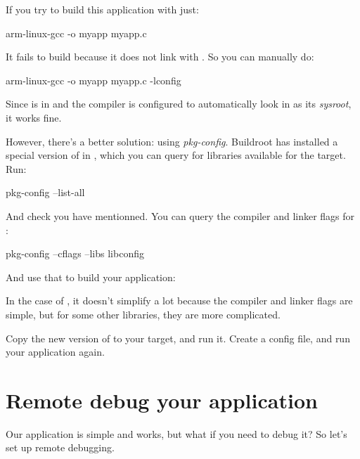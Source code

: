 If you try to build this application with just:

\begin{bashinput}
arm-linux-gcc -o myapp myapp.c
\end{bashinput}

It fails to build because it does not link with . So
you can manually do:

\begin{bashinput}
arm-linux-gcc -o myapp myapp.c -lconfig
\end{bashinput}

Since  is in  and the
compiler is configured to automatically look in 
as its {\em sysroot}, it works fine.

However, there's a better solution: using {\em pkg-config}. Buildroot
has installed a special version of  in
, which you can query for libraries
available for the target. Run:

\begin{bashinput}
pkg-config --list-all
\end{bashinput}

And check you have  mentionned. You can query the
compiler and linker flags for :

\begin{bashinput}
pkg-config --cflags --libs libconfig
\end{bashinput}

And use that to build your application:


In the case of , it doesn't simplify a lot because the
compiler and linker flags are simple, but for some other libraries,
they are more complicated.

Copy the new version of  to your target, and run
it. Create a  config file, and run your application
again.

\section{Remote debug your application}

Our application is simple and works, but what if you need to debug it?
So let's set up remote debugging.


